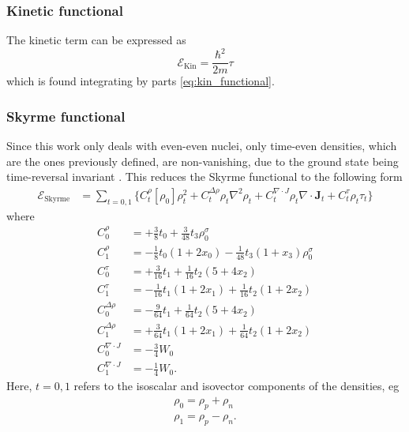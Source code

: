 \subsubsection{Kinetic functional}
The kinetic term can be expressed as
\begin{equation}
    \label{eq:kinfunc}
    \mathcal E_\text{Kin} = \frac{\hbar^2}{2m}\tau
\end{equation}
which is found integrating by parts \eqref{eq:kin_functional}.
\subsubsection{Skyrme functional}
Since this work only deals with even-even nuclei, only time-even densities, which are the ones previously defined, are non-vanishing, due to the ground state being time-reversal invariant \cite{Bender2003}. This reduces the Skyrme functional to the following form \cite{stevenson2019low}
\begin{align}
    \label{eq:skfunc}
    \mathcal E_\text{Skyrme} &= \sum_{t=0,1}\bigg\{C_t^\rho [\rho_0]\rho_t^2+C_t^{\Delta \rho}\rho_t\nabla^2\rho_t+C_t^{\nabla\cdot J}\rho_t\nabla\cdot \mathbf J_t + C_t^\tau\rho_t\tau_t\bigg\}
\end{align}
where
\begin{align}
    C_0^\rho &= +\frac 3 8 t_0 + \frac 3 {48} t_3\rho_0^\sigma \label{eq:C0rho}
    \\C_1^\rho &= -\frac 1 8 t_0(1+2x_0)- \frac 1 {48} t_3(1+x_3)\rho_0^\sigma \label{eq:C1rho}
    \\C_0^\tau &= +\frac 3 {16} t_1 + \frac 1 {16} t_2 (5+4x_2) \label{eq:C0tau}
    \\C_1^\tau &= -\frac 1 {16} t_1(1+2x_1)+\frac 1 {16}t_2(1+2x_2) \label{eq:C1tau}
    \\C_0^{\Delta \rho} &= -\frac 9 {64}t_1+\frac 1 {64}t_2(5+4x_2) \label{eq:C0Deltarho}
    \\C_1^{\Delta \rho} &= +\frac 3 {64}t_1(1+2x_1)+\frac 1 {64}t_2(1+2x_2) \label{eq:C1Deltarho}
    \\C_0^{\nabla\cdot J} &= -\frac 3 4 W_0 \label{eq:C0nabladotJ}
    \\C_1^{\nabla\cdot J} &= -\frac 1 4 W_0 \label{eq:C1nabladotJ}.
\end{align}
Here, $t=0,1$ refers to the isoscalar and isovector components of the densities, eg
\begin{align*}
    \rho_0 = \rho_p + \rho_n
    \\\rho_1 = \rho_p - \rho_n.
\end{align*}
